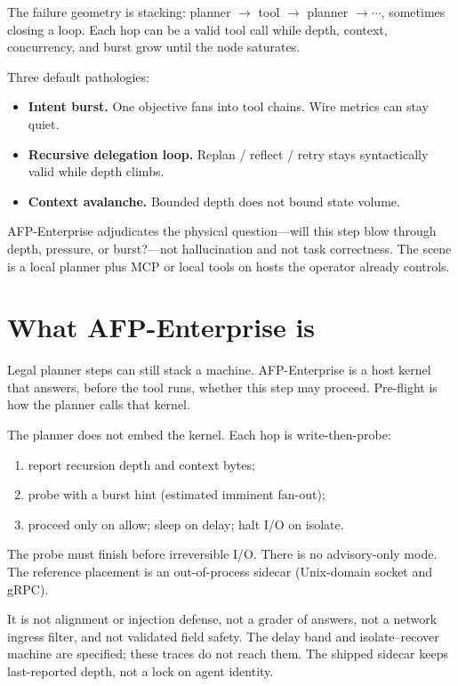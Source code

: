 \documentclass[11pt,a4paper]{article}
\begin{document}
The failure geometry is stacking: planner $\to$ tool $\to$ planner $\to\cdots$, sometimes closing a loop.
Each hop can be a valid tool call while depth, context, concurrency, and burst grow until the node saturates.

Three default pathologies:
\begin{itemize}
  \item \textbf{Intent burst.} One objective fans into tool chains. Wire metrics can stay quiet.
  \item \textbf{Recursive delegation loop.} Replan / reflect / retry stays syntactically valid while depth climbs.
  \item \textbf{Context avalanche.} Bounded depth does not bound state volume.
\end{itemize}

AFP-Enterprise adjudicates the physical question---will this step blow through depth, pressure, or burst?---not hallucination and not task correctness.
The scene is a local planner plus MCP or local tools on hosts the operator already controls.

\section{What AFP-Enterprise is}

Legal planner steps can still stack a machine.
AFP-Enterprise is a host kernel that answers, before the tool runs, whether this step may proceed.
Pre-flight is how the planner calls that kernel.

The planner does not embed the kernel.
Each hop is write-then-probe:
\begin{enumerate}
  \item report recursion depth and context bytes;
  \item probe with a burst hint (estimated imminent fan-out);
  \item proceed only on allow; sleep on delay; halt I/O on isolate.
\end{enumerate}

The probe must finish before irreversible I/O.
There is no advisory-only mode.
The reference placement is an out-of-process sidecar (Unix-domain socket and gRPC).

It is not alignment or injection defense, not a grader of answers, not a network ingress filter, and not validated field safety.
The delay band and isolate--recover machine are specified; these traces do not reach them.
The shipped sidecar keeps last-reported depth, not a lock on agent identity.
\end{document}
